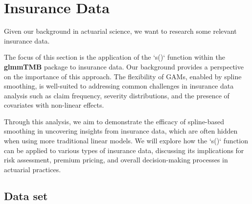 \section{Insurance Data}

Given our background in actuarial science, we want to research some relevant insurance data.


The focus of this section is the application of the `s()` function within the \textbf{glmmTMB} package to insurance data. Our background provides a perspective on the importance of this approach. The flexibility of GAMs, enabled by spline smoothing, is well-suited to addressing common challenges in insurance data analysis such as claim frequency, severity distributions, and the presence of covariates with non-linear effects.


Through this analysis, we aim to demonstrate the efficacy of spline-based smoothing in uncovering insights from insurance data, which are often hidden when using more traditional linear models. We will explore how the `s()` function can be applied to various types of insurance data, discussing its implications for risk assessment, premium pricing, and overall decision-making processes in actuarial practices.


\subsection{Data set}

